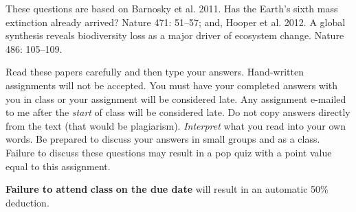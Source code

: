 \documentclass[11pt, addpoints]{exam}
\begin{document}
These questions are based on Barnosky et al. 2011. Has the Earth's sixth
mass extinction already arrived? Nature 471: 51--57; and, Hooper et al.
2012. A global synthesis reveals biodiversity loss as a major driver of
ecosystem change. Nature 486: 105--109.

Read these papers carefully and then type your answers. Hand-written
assignments will not be accepted. You must have your completed answers
with you in class or your assignment will be considered late. Any
assignment e-mailed to me after the \emph{start} of class will be
considered late. Do not copy answers directly from the text (that would
be plagiarism). \emph{Interpret} what you read into your own words. Be
prepared to discuss your answers in small groups and as a class. Failure
to discuss these questions may result in a pop quiz with a point value
equal to this assignment.

\textbf{Failure to attend} \textbf{class} \textbf{on the due date} will
result in an automatic 50\% deduction.
\end{document}
